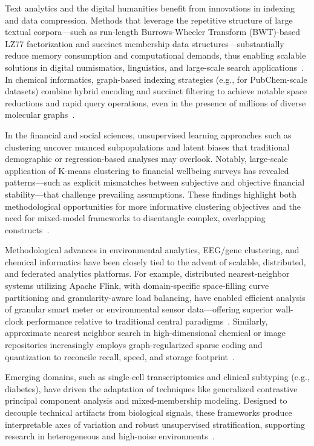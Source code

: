 \documentclass[sigconf]{acmart}
\begin{document}
Text analytics and the digital humanities benefit from innovations in indexing and data compression. Methods that leverage the repetitive structure of large textual corpora—such as run-length Burrows-Wheeler Transform (BWT)-based LZ77 factorization and succinct membership data structures—substantially reduce memory consumption and computational demands, thus enabling scalable solutions in digital numismatics, linguistics, and large-scale search applications~\cite{ref66,ref78,ref96}. In chemical informatics, graph-based indexing strategies (e.g., for PubChem-scale datasets) combine hybrid encoding and succinct filtering to achieve notable space reductions and rapid query operations, even in the presence of millions of diverse molecular graphs~\cite{ref92,ref93}.

In the financial and social sciences, unsupervised learning approaches such as clustering uncover nuanced subpopulations and latent biases that traditional demographic or regression-based analyses may overlook. Notably, large-scale application of K-means clustering to financial wellbeing surveys has revealed patterns—such as explicit mismatches between subjective and objective financial stability—that challenge prevailing assumptions. These findings highlight both methodological opportunities for more informative clustering objectives and the need for mixed-model frameworks to disentangle complex, overlapping constructs~\cite{ref59}.

Methodological advances in environmental analytics, EEG/gene clustering, and chemical informatics have been closely tied to the advent of scalable, distributed, and federated analytics platforms. For example, distributed nearest-neighbor systems utilizing Apache Flink, with domain-specific space-filling curve partitioning and granularity-aware load balancing, have enabled efficient analysis of granular smart meter or environmental sensor data—offering superior wall-clock performance relative to traditional central paradigms~\cite{ref80}. Similarly, approximate nearest neighbor search in high-dimensional chemical or image repositories increasingly employs graph-regularized sparse coding and quantization to reconcile recall, speed, and storage footprint~\cite{ref85,ref86,ref95}.

Emerging domains, such as single-cell transcriptomics and clinical subtyping (e.g., diabetes), have driven the adaptation of techniques like generalized contrastive principal component analysis and mixed-membership modeling. Designed to decouple technical artifacts from biological signals, these frameworks produce interpretable axes of variation and robust unsupervised stratification, supporting research in heterogeneous and high-noise environments~\cite{ref77,ref81}.
\end{document}
